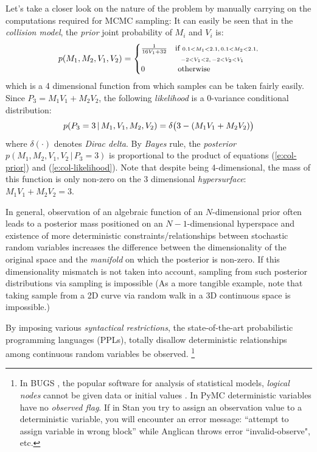 \documentclass{article}
\newcommand{\otherwise}[1]{#1 &\text{ otherwise}}
\newcommand{\pr}{p}
\begin{document}
Let's take a closer look on the nature of the problem by manually carrying on the computations required for MCMC sampling:
It can easily be seen that in the \emph{collision model}, 
the \emph{prior} joint probability of 
{\footnotesize $M_i$} and 
{\footnotesize $V_i$} is:
\begin{equation} \footnotesize  
\label{e:col-prior}
\pr(M_1, M_2, V_1, V_2)  
=
\begin{cases}
\frac{1}{16 V_1 + 32} &{\text{if }\scriptstyle 0.1<M_1<2.1, \, 0.1<M_2<2.1,}\\
							 &{\;\;\, \scriptstyle -2<V_1<2, \, -2<V_2 < V_1}\\
 \otherwise{0}
 \end{cases}
\end{equation}
which is a 4 dimensional function from which samples can be taken fairly easily. 
Since {\footnotesize $P_3 = M_1 V_1 + M_2 V_2$}, 
the following \emph{likelihood} is a 0-variance conditional distribution:
\begin{equation}\footnotesize 
\label{e:col-likelihood}
\pr(P_3 = 3 \,|\, M_1, V_1, M_2, V_2) = \delta\big( 3 - (M_1 V_1 + M_2 V_2) \big)
\end{equation}
where $\delta(\cdot)$ denotes \emph{Dirac delta}. 
By \emph{Bayes} rule, 
the \emph{posterior} 
{\footnotesize $\pr(M_1, M_2, V_1, V_2 \,|\, P_3 = 3)$}
is proportional to the product of equations (\ref{e:col-prior}) and (\ref{e:col-likelihood}).
Note that despite being 4-dimensional, 
the mass of this function is only non-zero on the 3 dimensional \emph{hypersurface}: {\footnotesize$M_1 V_1 + M_2 V_2 = 3$}. 


In general, observation of an algebraic function of an $N$-dimensional prior often leads to a posterior mass positioned on an $N-1$-dimensional hyperspace and existence of more deterministic constraints/relationships between stochastic random variables increases the difference between the dimensionality of the original space and the \emph{manifold} on which the posterior is non-zero.  
If this dimensionality mismatch is not taken into account, sampling from such posterior distributions via sampling is impossible (As a more tangible example, note that taking sample from a 2D curve via random walk in a 3D continuous space is impossible.)  

By imposing various %
\emph{syntactical restrictions},%
the state-of-the-art probabilistic programming languages (PPLs),
totally disallow deterministic relationships among continuous random variables be observed.
\footnote{
In BUGS \cite{lunn2009bugs}, the popular software for analysis of statistical models, \emph{logical nodes} cannot be given data or initial values .
In PyMC \cite{patil2010pymc} deterministic variables have no \emph{observed flag}. 
If in Stan \cite{stan-manual:2014} 
you try to assign an observation value to a deterministic variable, you will encounter an error message: 
``attempt to assign variable in wrong block'' while 
Anglican \cite{wood2014new} throws error ``invalid-observe", etc.}
\end{document}
